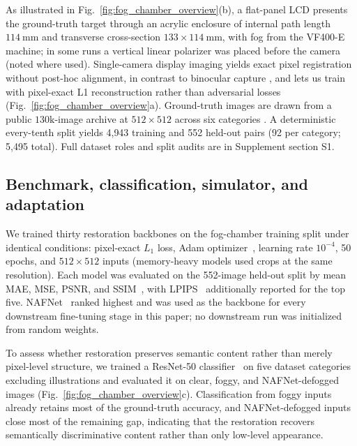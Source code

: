 \documentclass{optica-article}
\begin{document}
As illustrated in Fig.~\ref{fig:fog_chamber_overview}(b), a flat-panel LCD presents the ground-truth target through an acrylic
enclosure of internal path length $114~\mathrm{mm}$ and transverse
cross-section $133 \times 114~\mathrm{mm}$, with fog from the VF400-E
machine; in some runs a vertical linear polarizer was placed before
the camera (noted where used). Single-camera display imaging yields
exact pixel registration without post-hoc alignment, in contrast to
binocular capture \cite{pollak2024stereofog}, and lets us train with
pixel-exact L1 reconstruction rather than adversarial losses (Fig.~\ref{fig:fog_chamber_overview}a).
Ground-truth images are drawn from a public $130\mathrm{k}$-image
archive at $512 \times 512$ across six categories \cite{singh130kimages}.
A deterministic every-tenth split yields 4{,}943 training and 552
held-out pairs (92 per category; 5{,}495 total). Full dataset roles
and split audits are in Supplement section S1.
 
\subsection{Benchmark, classification, simulator, and adaptation}
\label{sec:methods-benchmark}
We trained thirty restoration backbones on the fog-chamber training
split under identical conditions: pixel-exact $L_1$ loss, Adam
optimizer~\cite{kingma2015adam}, learning rate $10^{-4}$, 50 epochs,
and $512\times512$ inputs (memory-heavy models used crops at the
same resolution). Each model was evaluated on the 552-image held-out
split by mean MAE, MSE, PSNR, and SSIM~\cite{wang2004ssim}, with
LPIPS~\cite{zhang2018lpips} additionally reported for the top five.
NAFNet~\cite{chen2022simple} ranked highest and was used as the
backbone for every downstream fine-tuning stage in this paper; no
downstream run was initialized from random weights.

To assess whether restoration preserves semantic content rather than
merely pixel-level structure, we trained a ResNet-50
classifier~\cite{he2016deep} on five dataset categories excluding illustrations and
evaluated it on clear, foggy, and NAFNet-defogged images
(Fig.~\ref{fig:fog_chamber_overview}c). Classification from foggy
inputs already retains most of the ground-truth accuracy, and
NAFNet-defogged inputs close most of the remaining gap, indicating
that the restoration recovers semantically discriminative content
rather than only low-level appearance.
\end{document}
